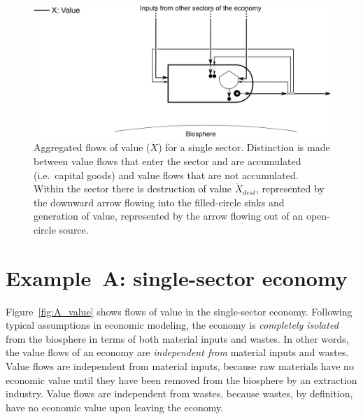 \begin{figure}[!ht]
\centering
\includegraphics[width=\linewidth]{Part_2/Chapter_Values/images/PERKS_basic_unit_value.pdf}
\caption[Aggregated flows of value for a single sector]{Aggregated flows of value ($\dot{X}$) 
for a single sector. 
Distinction is made between value flows that 
enter the sector and are accumulated (i.e.\ capital goods) 
and value flows that are not accumulated. 
Within the sector there is destruction of value $\dot{X}_{dest}$, 
represented by the downward arrow flowing 
into the filled-circle sinks and generation of value, 
represented by the arrow flowing out of an open-circle source.}
\label{fig:basic_value_aggregated} 
\end{figure}


\section{Example~A: single-sector economy} %
\label{sec:value_example_A}

Figure~\ref{fig:A_value} shows flows of value in the single-sector economy.
Following typical assumptions in economic modeling, 
the economy is \emph{completely isolated} from the biosphere
in terms of both material inputs and wastes.
In other words, the value flows of an economy are \emph{independent from}
material inputs and wastes.
Value flows are independent from material inputs,
because raw materials have no economic value 
until they have been removed from the biosphere by an extraction industry.
Value flows are independent from wastes,
because wastes, by definition, have no economic value 
upon leaving the economy.

